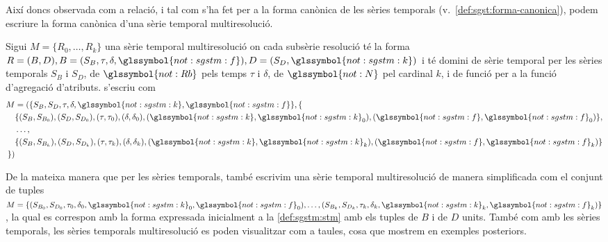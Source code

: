 Així doncs observada com a relació, i tal com s'ha fet per a la forma
canònica de les sèries temporals
(v.~\autoref{def:sgst:forma-canonica}), podem escriure la forma
canònica d'una sèrie temporal multiresolució.
\begin{definition}
  Sigui $M=\{R_0,\dotsc,R_k\}$ una sèrie temporal multiresolució on
  cada subsèrie resolució té la forma $R =(B,D),
  B=(S_{B},\tau,\delta,\glssymbol{not:sgstm:f}),
  D=(S_{D},\glssymbol{not:sgstm:k})$ i té domini de sèrie temporal
  per les sèries temporals $S_{B}$ i $S_{D}$, de
  $\glssymbol{not:Rb}$ pels temps $\tau$ i $\delta$, de
  $\glssymbol{not:N}$ pel cardinal $k$, i de funció per a la funció
  d'agregació d'atributs.  s'escriu com 
  \begin{align*} 
    M &= (\{S_B, S_D, \tau,
  \delta,\glssymbol{not:sgstm:k}, \glssymbol{not:sgstm:f}\}, \{ \\
  &\{ (S_B, S_{B_0}) , (S_D , S_{D_0}) , (\tau, \tau_0), (\delta,
  \delta_0), (\glssymbol{not:sgstm:k}, \glssymbol{not:sgstm:k}_0), (\glssymbol{not:sgstm:f}, \glssymbol{not:sgstm:f}_0) \} ,\\
    &\dotsc,\\
   &\{ (S_B, S_{B_k}) , (S_D
  , S_{D_k}) , (\tau, \tau_k), (\delta, \delta_k), (\glssymbol{not:sgstm:k}, \glssymbol{not:sgstm:k}_k), (\glssymbol{not:sgstm:f}, \glssymbol{not:sgstm:f}_k)
  \}\\
  \} )
\end{align*}

\end{definition}



De la mateixa manera que per les sèries temporals, també escrivim
una sèrie temporal multiresolució de manera simplificada com el
conjunt de tuples $M = \{ (S_{B_0}, S_{D_0} , \tau_0, \delta_0, \glssymbol{not:sgstm:k}_0,
\glssymbol{not:sgstm:f}_0 ), \dotsc, (S_{B_k}, S_{D_k} , \tau_k, \delta_k, \glssymbol{not:sgstm:k}_k, \glssymbol{not:sgstm:f}_k ) \}$,
la qual es correspon amb la forma expressada inicialment a la
\autoref{def:sgstm:stm} amb els tuples de $B$ i de $D$ units.  També
com amb les sèries temporals, les sèries temporals multiresolució es
poden visualitzar com a taules, cosa que mostrem en exemples
posteriors.






